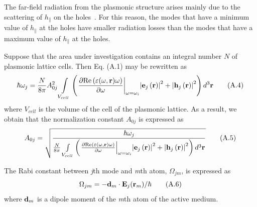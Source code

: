 \documentclass[aps,prapplied,amsmath,amssymb,onecolumn,superscriptaddress,showpacs,floatfix,longbibliography]{revtex4-1}
\begin{document}
The far-field radiation from the plasmonic structure arises mainly due to the scattering of $h_{\parallel}$ on the holes~\cite{TennerJOpt}. 
For this reason, the modes that have a minimum value of $h_{\parallel}$ at the holes have smaller radiation losses than the modes that have a maximum value of $h_{\parallel}$ at the holes.

Suppose that the area under investigation contains an integral number $N$ of plasmonic lattice cells.
Then Eq. (A.1) may be rewritten as
\begin{equation}
\hbar {\omega _j} =\frac{N}{{8\pi }} A_{0j}^2 \int\limits_{{V_{cell}}} {\left( {{{\left. {\frac{{\partial {\mathop{\rm Re}\nolimits} \left( {\varepsilon(\omega, \textbf{r}) \omega } \right)}}{{\partial \omega }}} \right|}_{\omega  = {\omega _i}}}{{\left| {{{\bf{e}}_j}\left( {\bf{r}} \right)} \right|}^2} + {{\left| {{{\bf{h}}_j}\left( {\bf{r}} \right)} \right|}^2}} \right){d^3}{\bf{r}}} \tag{A.4}
\end{equation}
where ${V_{cell}}$  is the volume of the cell of the plasmonic lattice. As a result, we obtain that the normalization constant $A_{0j}$ is expressed as
\begin{equation}
A_{0j} =\sqrt{\frac{\hbar {\omega _j}}{\frac{N}{{8\pi }} \int\limits_{{V_{cell}}} {\left( {{{\left. {\frac{{\partial {\mathop{\rm Re}\nolimits} \left( {\varepsilon(\omega, \textbf{r}) \omega } \right)}}{{\partial \omega }}} \right|}_{\omega  = {\omega _i}}}{{\left| {{{\bf{e}}_j}\left( {\bf{r}} \right)} \right|}^2} + {{\left| {{{\bf{h}}_j}\left( {\bf{r}} \right)} \right|}^2}} \right){d^3}{\bf{r}}}}} \tag{A.5}
\end{equation}

The Rabi constant between \textit{j}th mode and \textit{m}th atom, ${\Omega _{jm}}$, is expressed as
\begin{equation}
{\Omega _{jm}} =  - {{{\bf{d}}_m} \cdot {{\bf{E}}_j}({{\bf{r}}_m})/ \hbar} \tag{A.6}
\end{equation}
where ${\bf{d}}_m$ is a dipole moment of the \textit{m}th atom of the active medium.
\end{document}
